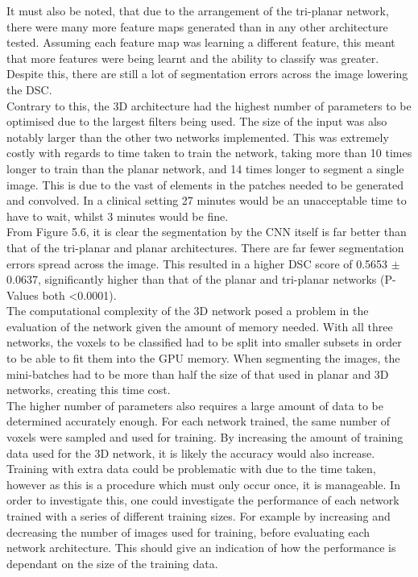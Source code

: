 \documentclass[11pt,a4paper]{memoir}
\numberwithin{figure}{section}
\numberwithin{table}{section}
\numberwithin{equation}{section}
\begin{document}
It must also be noted, that due to the arrangement of the tri-planar network, there were many more feature maps generated than in any other architecture tested. Assuming each feature map was learning a different feature, this meant that more features were being learnt and the ability to classify was greater. Despite this, there are still a lot of segmentation errors across the image lowering the DSC.\\

Contrary to this, the 3D architecture had the highest number of parameters to be optimised due to the largest filters being used. The size of the input was also notably larger than the other two networks implemented. This was extremely costly with regards to time taken to train the network, taking more than 10 times longer to train than the planar network, and 14 times longer to segment a single image. This is due to the vast of elements in the patches needed to be generated and convolved. In a clinical setting 27 minutes would be an unacceptable time to have to wait, whilst 3 minutes would be fine. \\ 

From Figure 5.6, it is clear the segmentation by the CNN itself is far better than that of the tri-planar and planar architectures. There are far fewer segmentation errors spread across the image. This resulted in a higher DSC score of 0.5653 $\pm$ 0.0637, significantly higher than that of the planar and tri-planar networks (P-Values both \textless 0.0001).\\

The computational complexity of the 3D network posed a problem in the evaluation of the network given the amount of memory needed. With all three networks, the voxels to be classified had to be split into smaller subsets in order to be able to fit them into the GPU memory. When segmenting the images, the mini-batches had to be more than half the size of that used in planar and 3D networks, creating this time cost. \\

The higher number of parameters also requires a large amount of data to be determined accurately enough. For each network trained, the same number of voxels were sampled and used for training. By increasing the amount of training data used for the 3D network, it is likely the accuracy would also increase. Training with extra data could be problematic with due to the time taken, however as this is a procedure which must only occur once, it is manageable. In order to investigate this, one could investigate the performance of each network trained with a series of different training sizes. For example by increasing and decreasing the number of images used for training, before evaluating each network architecture. This should give an indication of how the performance is dependant on the size of the training data.\\
\end{document}
